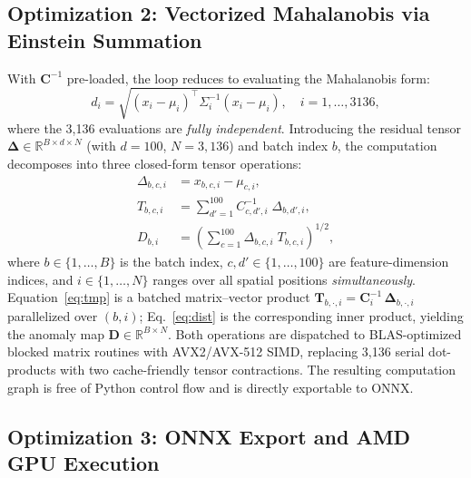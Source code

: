 \documentclass[blind]{gtac}
\begin{document}
\subsection{Optimization 2: Vectorized Mahalanobis via Einstein Summation}

With $\mathbf{C}^{-1}$ pre-loaded, the loop reduces to evaluating the
Mahalanobis form:
%
\begin{equation}
  d_i = \sqrt{(x_i - \mu_i)^\top \Sigma_i^{-1} (x_i - \mu_i)}, \quad i=1,\ldots,3136,
\end{equation}
%
where the 3{,}136 evaluations are \emph{fully independent}.  Introducing the
residual tensor $\boldsymbol{\Delta} \in \mathbb{R}^{B \times d \times N}$
(with $d\!=\!100$, $N\!=\!3{,}136$) and batch index $b$, the computation
decomposes into three closed-form tensor operations:
%
\begin{align}
  \Delta_{b,c,i}
    &= x_{b,c,i} - \mu_{c,i},
    \label{eq:diff}\\
  T_{b,c,i}
    &= \sum_{d'=1}^{100} C^{-1}_{c,d'\!,i}\;\Delta_{b,d'\!,i},
    \label{eq:tmp}\\
  D_{b,i}
    &= \!\left(\sum_{c=1}^{100} \Delta_{b,c,i}\;T_{b,c,i}\right)^{\!\!1/2},
    \label{eq:dist}
\end{align}
%
where $b \in \{1,\ldots,B\}$ is the batch index, $c,d' \in \{1,\ldots,100\}$
are feature-dimension indices, and $i \in \{1,\ldots,N\}$ ranges over all
spatial positions \emph{simultaneously}.  Equation~\eqref{eq:tmp} is a
batched matrix--vector product $\mathbf{T}_{b,\cdot,i} =
\mathbf{C}^{-1}_i\,\boldsymbol{\Delta}_{b,\cdot,i}$ parallelized over $(b,i)$;
Eq.~\eqref{eq:dist} is the corresponding inner product, yielding the anomaly
map $\mathbf{D} \in \mathbb{R}^{B \times N}$.  Both operations are dispatched
to BLAS-optimized blocked matrix routines with AVX2/AVX-512 SIMD, replacing
3{,}136 serial dot-products with two cache-friendly tensor contractions.  The
resulting computation graph is free of Python control flow and is directly
exportable to ONNX.

\subsection{Optimization 3: ONNX Export and AMD GPU Execution}
\end{document}
